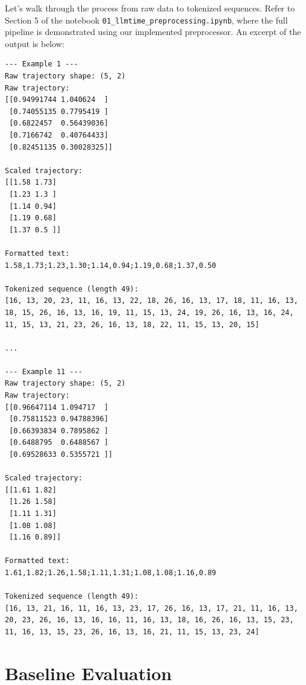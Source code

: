 \documentclass[11pt]{article}
\begin{document}
Let's walk through the process from raw data to tokenized sequences. Refer to Section 5 of the notebook \texttt{01\_llmtime\_preprocessing.ipynb}, where the full pipeline is demonstrated using our implemented preprocessor. An excerpt of the output is below:

\begin{lstlisting}[style=notebookoutput, caption={Examples showing the full processing pipeline applied to raw population trajectories (slices of 5 time steps). Each example includes the raw input, scaled and rounded version (using a scaling factor of 0.6007—corresponding to the 99th percentile of the training data—and two decimal places), the formatted string representation, and the corresponding tokenized sequence with integer token IDs.}]
--- Example 1 ---
Raw trajectory shape: (5, 2)
Raw trajectory:
[[0.94991744 1.040624  ]
 [0.74055135 0.7795419 ]
 [0.6822457  0.56439036]
 [0.7166742  0.40764433]
 [0.82451135 0.30028325]]

Scaled trajectory:
[[1.58 1.73]
 [1.23 1.3 ]
 [1.14 0.94]
 [1.19 0.68]
 [1.37 0.5 ]]

Formatted text:
1.58,1.73;1.23,1.30;1.14,0.94;1.19,0.68;1.37,0.50

Tokenized sequence (length 49):
[16, 13, 20, 23, 11, 16, 13, 22, 18, 26, 16, 13, 17, 18, 11, 16, 13, 18, 15, 26, 16, 13, 16, 19, 11, 15, 13, 24, 19, 26, 16, 13, 16, 24, 11, 15, 13, 21, 23, 26, 16, 13, 18, 22, 11, 15, 13, 20, 15]

...

--- Example 11 ---
Raw trajectory shape: (5, 2)
Raw trajectory:
[[0.96647114 1.094717  ]
 [0.75811523 0.94788396]
 [0.66393834 0.7895862 ]
 [0.6488795  0.6488567 ]
 [0.69528633 0.5355721 ]]

Scaled trajectory:
[[1.61 1.82]
 [1.26 1.58]
 [1.11 1.31]
 [1.08 1.08]
 [1.16 0.89]]

Formatted text:
1.61,1.82;1.26,1.58;1.11,1.31;1.08,1.08;1.16,0.89

Tokenized sequence (length 49):
[16, 13, 21, 16, 11, 16, 13, 23, 17, 26, 16, 13, 17, 21, 11, 16, 13, 20, 23, 26, 16, 13, 16, 16, 11, 16, 13, 18, 16, 26, 16, 13, 15, 23, 11, 16, 13, 15, 23, 26, 16, 13, 16, 21, 11, 15, 13, 23, 24]

\end{lstlisting}



\section{Baseline Evaluation}
\end{document}
